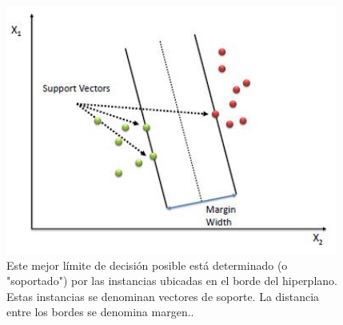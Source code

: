 \begin{figure}
    \centering
    \includegraphics[scale=1]{figuras/Capture3.PNG}
    \caption{Este mejor límite de decisión posible está determinado (o "soportado") por las instancias ubicadas en el borde del hiperplano. Estas instancias se denominan vectores de soporte.  La distancia entre los bordes se denomina margen..}
    \label{fig:my_label}
\end{figure}

